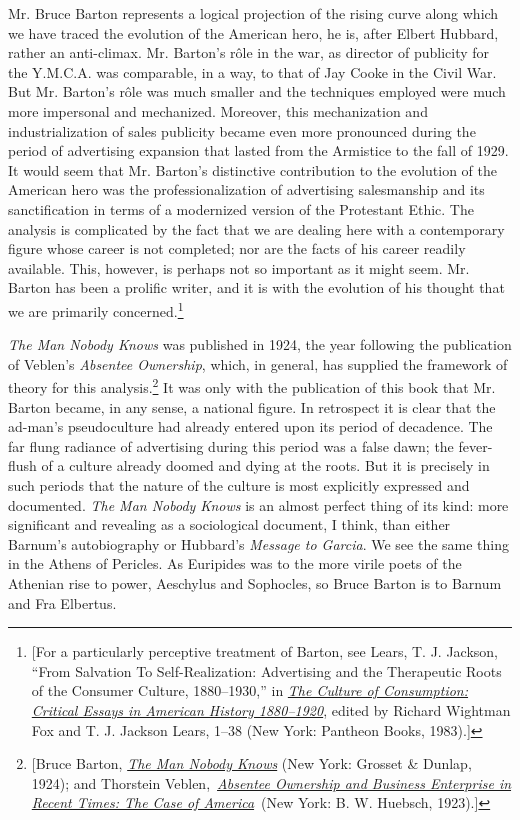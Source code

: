 \documentclass[twoside,nohyper,openany,nobib]{tufte-book}
\begin{document}
 Mr. Bruce Barton represents a logical projection of the rising
curve along which we have traced the evolution of the American hero, he
is, after Elbert Hubbard, rather an anti-climax. Mr. Barton's r\^ole in
the war, as director of publicity for the Y.M.C.A. was comparable, in a
way, to that of Jay Cooke in the Civil War. But Mr. Barton's r\^ole was
much smaller and the techniques employed were much more impersonal and
mechanized. Moreover, this mechanization and industrialization of sales
publicity became even more pronounced during the period of advertising
expansion that lasted from the Armistice to the fall of 1929. It would
seem that Mr. Barton's distinctive contribution to the evolution of the
American hero was the professionalization of advertising salesmanship
and its sanctification in terms of a modernized version of the
Protestant Ethic. The analysis is complicated by the fact that we are
dealing here with a contemporary figure whose career is not completed;
nor are the facts of his career readily available. This, however, is
perhaps not so important as it might seem. Mr. Barton has been a
prolific writer, and it is with the evolution of his thought that we are
primarily concerned.\footnote{{[}For a particularly perceptive treatment of Barton, see Lears, T. J.
  Jackson, ``From Salvation To Self-Realization: Advertising and the
  Therapeutic Roots of the Consumer Culture, 1880--1930,'' in
  \emph{\href{http://www.worldcat.org/oclc/654538769}{The Culture of
  Consumption: Critical Essays in American History 1880--1920}}, edited
  by Richard Wightman Fox and T. J. Jackson Lears, 1--38 (New York:
  Pantheon Books, 1983).{]}}
  
\enlargethispage{\baselineskip}

\emph{The Man Nobody Knows} was published in 1924, the year following
the publication of Veblen's \emph{Absentee Ownership}, which, in
general, has supplied the framework of theory for this analysis.\footnote{{[}Bruce Barton,
  \emph{\href{http://www.worldcat.org/oclc/70421692}{The Man Nobody
  Knows}} (New York: Grosset \& Dunlap, 1924); and Thorstein
  Veblen,~\emph{\href{http://www.worldcat.org/oclc/752183}{Absentee
  Ownership and Business Enterprise in Recent Times: The Case of
  America}}~(New York: B. W. Huebsch, 1923).{]}} It
was only with the publication of this book that Mr. Barton became, in
any sense, a national figure. In retrospect it is clear that the
ad-man's pseudoculture had already entered upon its period of decadence.
The far flung radiance of advertising during this period was a false
dawn; the fever-flush of a culture already doomed and dying at the
roots. But it is precisely in such periods that the nature of the
culture is most explicitly expressed and documented. \emph{The Man
Nobody Knows} is an almost perfect thing of its kind: more significant
and revealing as a sociological document, I think, than either Barnum's
autobiography or Hubbard's \emph{Message to Garcia}. We see the same
thing in the Athens of Pericles. As Euripides was to the more virile
poets of the Athenian rise to power, Aeschylus and Sophocles, so Bruce
Barton is to Barnum and Fra Elbertus.
\end{document}

